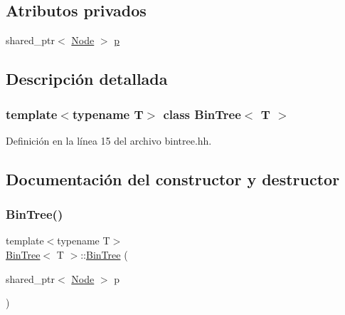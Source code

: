 \subsection*{Atributos privados}
\begin{DoxyCompactItemize}
\item 
shared\+\_\+ptr$<$ \mbox{\hyperlink{struct_bin_tree_1_1_node}{Node}} $>$ \mbox{\hyperlink{class_bin_tree_afe3647af1dda90f6ddf1deee6560fcf1}{p}}
\end{DoxyCompactItemize}


\subsection{Descripción detallada}
\subsubsection*{template$<$typename T$>$\newline
class Bin\+Tree$<$ T $>$}



Definición en la línea 15 del archivo bintree.\+hh.



\subsection{Documentación del constructor y destructor}
\mbox{\label{class_bin_tree_a1408d37d1afda12d99747d09543c15f4}} 
\subsubsection{\texorpdfstring{Bin\+Tree()}{BinTree()}\hspace{0.1cm}{\footnotesize\ttfamily [1/4]}}
{\footnotesize\ttfamily template$<$typename T$>$ \\
\mbox{\hyperlink{class_bin_tree}{Bin\+Tree}}$<$ T $>$\+::\mbox{\hyperlink{class_bin_tree}{Bin\+Tree}} (\begin{DoxyParamCaption}\item[{shared\+\_\+ptr$<$ \mbox{\hyperlink{struct_bin_tree_1_1_node}{Node}} $>$}]{p }\end{DoxyParamCaption})\hspace{0.3cm}{\ttfamily [private]}}



